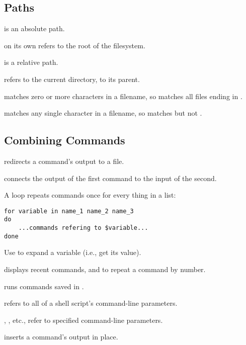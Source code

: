 \subsection*{Paths}

\begin{swcitemize}
\item
   is an absolute path.
\item
  \code{/} on its own refers to the root of the filesystem.
\item
   is a relative path.
\item
   refers to the current directory,  to its parent.
\item
  \code{*} matches zero or more characters in a filename, so
   matches all files ending in .
\item
   matches any single character in a filename, so
   matches  but not .
\end{swcitemize}

\subsection*{Combining Commands}

\begin{swcitemize}
\item
   redirects a command's output to a
  file.
\item
   connects the output of the first
  command to the input of the second.
\item
  A  loop repeats commands once for every thing in a list:

\begin{Verbatim}
for variable in name_1 name_2 name_3
do
    ...commands refering to $variable...
done
\end{Verbatim}
\item
  Use  to expand a variable (i.e., get its value).
\item
   displays recent commands, and  to
  repeat a command by number.
\item
   runs commands saved in .
\item
  \code{\$*} refers to all of a shell script's command-line
  parameters.
\item
  , , etc., refer to specified command-line
  parameters.
\item
   inserts a command's output in place.
\end{swcitemize}

